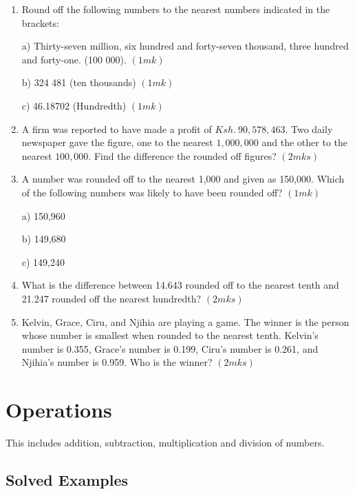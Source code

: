 \documentclass[
  letterpaper,
  DIV=11,
  numbers=noendperiod]{scrreprt}
\begin{document}
\begin{enumerate}
\def\labelenumi{\arabic{enumi}.}
\item
  Round off the following numbers to the nearest numbers indicated in
  the brackets:

  a) Thirty-seven million, six hundred and forty-seven thousand, three
  hundred and forty-one. (100 000). \((1mk)\)

  b) 324 481 (ten thousands) \((1mk)\)

  c) 46.18702 (Hundredth) \hspace{9.85cm} \((1mk)\)
\item
  A firm was reported to have made a profit of \(Ksh. ~90,578,463.\) Two
  daily newspaper gave the figure, one to the nearest \(1,000,000\) and
  the other to the nearest \(100,000\). Find the difference the rounded
  off figures? \((2mks)\)
\item
  A number was rounded off to the nearest 1,000 and given as 150,000.
  Which of the following numbers was likely to have been rounded off?
  \((1mk)\)

  a) 150,960

  b) 149,680

  c) 149,240
\item
  What is the difference between 14.643 rounded off to the nearest tenth
  and 21.247 rounded off the nearest hundredth? \((2mks)\)
\item
  Kelvin, Grace, Ciru, and Njihia are playing a game. The winner is the
  person whose number is smallest when rounded to the nearest tenth.
  Kelvin's number is 0.355, Grace's number is 0.199, Ciru's number is
  0.261, and Njihia's number is 0.959. Who is the winner? \((2mks)\)
\end{enumerate}

\hypertarget{operations}{%
\section{Operations}\label{operations}}

This includes addition, subtraction, multiplication and division of
numbers.

\hypertarget{solved-examples-2}{%
\subsection{Solved Examples}\label{solved-examples-2}}
\end{document}
